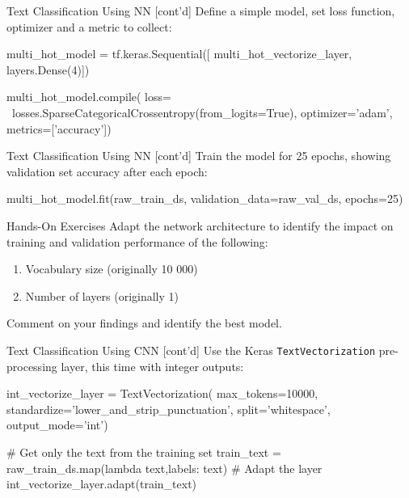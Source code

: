 \documentclass[ignorenonframetext,xcolor=x11names]{beamer}
\begin{document}
\begin{frame}[fragile]{Text Classification Using NN \small [cont'd]}
Define a simple model, set loss function, optimizer and a metric to collect:
\begin{pythoncode}
multi_hot_model = tf.keras.Sequential([
    multi_hot_vectorize_layer,
    layers.Dense(4)])

multi_hot_model.compile(
    loss= \
losses.SparseCategoricalCrossentropy(from_logits=True),
    optimizer='adam',
    metrics=['accuracy'])
\end{pythoncode}
\end{frame}

\begin{frame}[fragile]{Text Classification Using NN \small [cont'd]}
Train the model for 25 epochs, showing validation set accuracy after each epoch:
\begin{pythoncode}
multi_hot_model.fit(raw_train_ds, 
                    validation_data=raw_val_ds, 
                    epochs=25)
\end{pythoncode}
\end{frame}

\begin{frame}{Hands-On Exercises}
Adapt the network architecture to identify the impact on training and validation performance of the following:
   \begin{enumerate}
      \item Vocabulary size (originally 10 000)
      \item Number of layers (originally 1)
   \end{enumerate}
Comment on your findings and identify the best model.
\end{frame}


\begin{frame}[fragile]{Text Classification Using CNN \small [cont'd]}
Use the Keras \texttt{TextVectorization} pre-processing layer, this time with integer outputs:
\begin{pythoncode}
int_vectorize_layer = TextVectorization(
    max_tokens=10000,
    standardize='lower_and_strip_punctuation',
    split='whitespace',
    output_mode='int')
    
# Get only the text from the training set
train_text = raw_train_ds.map(lambda text,labels: text)
# Adapt the layer
int_vectorize_layer.adapt(train_text)
\end{pythoncode}
\end{frame}
\end{document}
